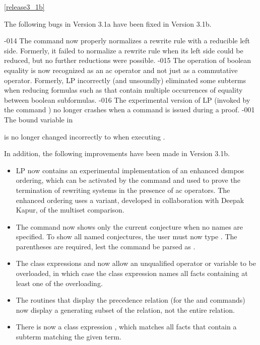 \ref{release3_1b}

The following bugs in Version 3.1a have been fixed in Version 3.1b.
\begin{description}
-014
\dd
The  command now properly normalizes a rewrite rule with a
reducible left side.  Formerly, it failed to normalize a rewrite rule when 
its left side could be reduced, but no further reductions were possible.
-015
\dd
The operation of boolean equality is now recognized as an ac operator and not
just as a commutative operator.  Formerly, LP incorrectly (and unsoundly)
eliminated some subterms when reducing formulas such as
 that contain multiple occurrences of equality
between boolean subformulas.
-016
\dd
The experimental version of LP (invoked by the command ) no longer
crashes when a  command is issued during  a proof.
-001
\dd
The bound variable  in
\begin{quote}
\end{quote}
is no longer changed incorrectly to  when executing
.
\end{description}

In addition, the following improvements have been made in Version 3.1b.

\begin{itemize}
\item
LP now contains an experimental implementation of an enhanced dsmpos ordering,
which can be activated by the  command and used to prove the
termination of rewriting systems in the presence of ac operators.  The enhanced
ordering uses a variant, developed in collaboration with Deepak Kapur, of the
multiset comparison.
\item
The command  now shows only the current
conjecture when no names are specified.  To show all named conjectures, the
user must now type .  The parentheses are required,
lest the command be parsed as .
\item
The class expressions  and
 now allow an unqualified operator
or variable to be overloaded, in which case the class expression names all
facts containing at least one of the overloading.
\item
The routines that display the precedence relation (for the  and
 commands) now display a generating subset of the relation,
not the entire relation.
\item
There is now a class expression , which
matches all facts that contain a subterm matching the given term.
\end{itemize}

